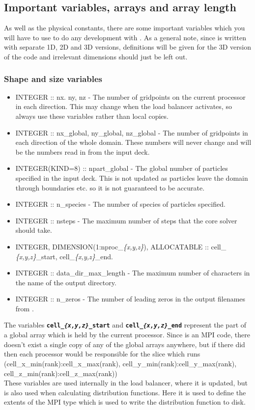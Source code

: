 \documentclass[12pt,a4paper]{article}
\newcommand{\inlinecode}[1]{{\color{warwickred} \bf\texttt{#1}}}
\newcommand{\EPOCH}{{\color{warwickdark}\fontfamily{phv}\selectfont{EPOCH}}}
\begin{document}
\subsection{Important variables, arrays and array length}
As well as the physical constants, there are some important variables which
you will have to use to do any development with {\EPOCH}. As a general note,
since {\EPOCH} is written with separate 1D, 2D and 3D versions, definitions will
be given for the 3D version of the code and irrelevant dimensions should just
be left out.

\subsubsection{Shape and size variables}
\begin{itemize}
\item INTEGER :: nx. ny, nz - The number of gridpoints on the current
  processor in each direction. This may change when the load balancer
  activates, so always use these variables rather than local copies.
\item INTEGER :: nx\_global, ny\_global, nz\_global - The number of gridpoints
  in each direction of the whole domain. These numbers will never change and
  will be the numbers read in from the input deck.
\item INTEGER(KIND=8) :: npart\_global - The global number of particles
  specified in the input deck. This is not updated as particles leave the
  domain through boundaries etc. so it is not guaranteed to be accurate.
\item INTEGER :: n\_species - The number of species of particles specified.
\item INTEGER :: nsteps - The maximum number of steps that the core solver
  should take.
\item INTEGER, DIMENSION(1:nproc\_{\it \{x,y,z\}}), ALLOCATABLE :: cell\_{\it
    \{x,y,z\}}\_start, cell\_{\it \{x,y,z\}}\_end.
\item INTEGER :: data\_dir\_max\_length - The maximum number of characters in
  the name of the output directory.
\item INTEGER :: n\_zeros - The number of leading zeros in the output filenames
  from {\EPOCH}.
\end{itemize}
The variables \inlinecode{cell\_{\it \{x,y,z\}}\_start} and
\inlinecode{cell\_{\it \{x,y,z\}}\_end} represent the part of a global array
which is held by the current processor. Since {\EPOCH} is an MPI code, there
doesn't exist a single copy of any of the global arrays anywhere, but if there
did then each processor would be responsible for the slice which runs\\
(cell\_x\_min(rank):cell\_x\_max(rank),
cell\_y\_min(rank):cell\_y\_max(rank),
cell\_z\_min(rank):cell\_z\_max(rank))\\
These variables are used internally in the load balancer, where it is updated,
but is also used when calculating distribution functions. Here it is used to
define the extents of the MPI type which is used to write the distribution
function to disk.
\end{document}
